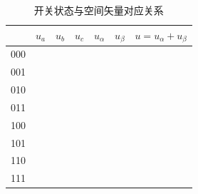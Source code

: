 \documentclass{ctexart}
\numberwithin{equation}{section}
\begin{document}
\begin{table}[]
  \begin{tabular}{lllllll}
  \hline
  \multicolumn{1}{|l|}{} & \multicolumn{1}{l|}{$u_a$} & \multicolumn{1}{l|}{$u_b$} & \multicolumn{1}{l|}{$u_c$} & \multicolumn{1}{l|}{$u_\alpha$} & \multicolumn{1}{l|}{$u_\beta$} & \multicolumn{1}{l|}{$u=u_\alpha + u_\beta$} \\ \hline
  000                    &                            &                            &                            &                                 &                                &                                             \\
  001                    &                            &                            &                            &                                 &                                &                                             \\
  010                    &                            &                            &                            &                                 &                                &                                             \\
  011                    &                            &                            &                            &                                 &                                &                                             \\
  100                    &                            &                            &                            &                                 &                                &                                             \\
  101                    &                            &                            &                            &                                 &                                &                                             \\
  110                    &                            &                            &                            &                                 &                                &                                             \\
  111                    &                            &                            &                            &                                 &                                &                                            
  \end{tabular}
  \caption{开关状态与空间矢量对应关系}
  \label{switch-mode}
\end{table}
\end{document}
